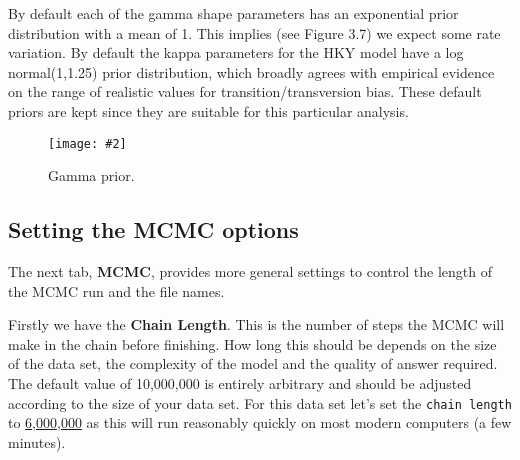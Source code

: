 \documentclass[11pt]{article}
\newcommand{\TODO}[1]{}
\theoremstyle{plain}%
\theoremstyle{definition}
\theoremstyle{remark}
\newcommand{\includeimage}[2][]{%
\texttt{[image: \#2]}
}
\newcommand{\chainLength}{{6,000,000}}
\begin{document}
By default each of the gamma shape parameters has an exponential prior
distribution with a mean of 1. This implies (see Figure 3.7) we expect some
rate variation. By default the kappa parameters for the HKY model have a log
normal(1,1.25) prior distribution, which broadly agrees with empirical evidence
\cite{rosenberg2003patterns} on the range of realistic values for transition/transversion
bias. These default priors are kept since they are suitable for this particular
analysis.

\begin{figure}
\centering
\includeimage[width=\textwidth]{figures/GammaPrior}
\label{fig:GammaPrior}
\caption{Gamma prior.}
\end{figure}



\subsection{Setting the MCMC options}


The next tab, {\bf MCMC}, provides more general
settings to control the length of the MCMC run and the file names. 

Firstly we have the \textbf{Chain Length}. This is the number of
steps the MCMC will make in the chain before finishing. How long this
should be depends on the size of the data set, the complexity of the
model and the quality of answer required. The default value of 10,000,000
is entirely arbitrary and should be adjusted according to the size
of your data set. For this data set let's set the \texttt{chain
length} to \underline{\chainLength{}} as this will run reasonably quickly on most modern
computers (a few minutes).
\end{document}
